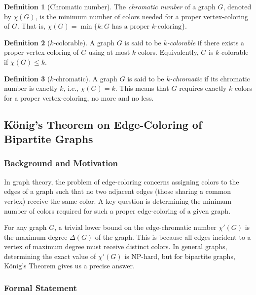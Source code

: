 \documentclass{article}
\theoremstyle{definition}
\newtheorem{definition}{Definition}
\begin{document}
\begin{definition}[Chromatic number]
The \emph{chromatic number} of a graph $G$, denoted by $\chi(G)$, is the minimum number of colors needed for a proper vertex-coloring of $G$. That is, $\chi(G) = \min\{k : G \text{ has a proper $k$-coloring}\}$.
\end{definition}

\begin{definition}[$k$-colorable]
A graph $G$ is said to be \emph{$k$-colorable} if there exists a proper vertex-coloring of $G$ using at most $k$ colors. Equivalently, $G$ is $k$-colorable if $\chi(G) \leq k$.
\end{definition}

\begin{definition}[$k$-chromatic]
A graph $G$ is said to be \emph{$k$-chromatic} if its chromatic number is exactly $k$, i.e., $\chi(G) = k$. This means that $G$ requires exactly $k$ colors for a proper vertex-coloring, no more and no less.
\end{definition}


\subsection{König's Theorem on Edge-Coloring of Bipartite Graphs}

\subsubsection{Background and Motivation}

In graph theory, the problem of edge-coloring concerns assigning colors to the edges of a graph such that no two adjacent edges (those sharing a common vertex) receive the same color. A key question is determining the minimum number of colors required for such a proper edge-coloring of a given graph.

For any graph $G$, a trivial lower bound on the edge-chromatic number $\chi'(G)$ is the maximum degree $\Delta(G)$ of the graph. This is because all edges incident to a vertex of maximum degree must receive distinct colors. In general graphs, determining the exact value of $\chi'(G)$ is NP-hard, but for bipartite graphs, König's Theorem gives us a precise answer.

\subsubsection{Formal Statement}
\end{document}
